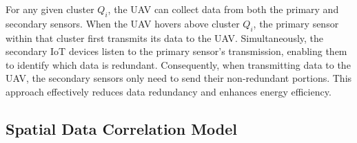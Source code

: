 \documentclass[sigconf]{acmart}
\begin{document}
For any given cluster $Q_i$, the UAV can collect data from both the primary and secondary sensors. When the UAV hovers above cluster $Q_i$, the primary sensor within that cluster first transmits its data to the UAV. Simultaneously, the secondary IoT devices listen to the primary sensor's transmission, enabling them to identify which data is redundant. Consequently, when transmitting data to the UAV, the secondary sensors only need to send their non-redundant portions. This approach effectively reduces data redundancy and enhances energy efficiency.



\subsection{Spatial Data Correlation Model}


\end{document}
